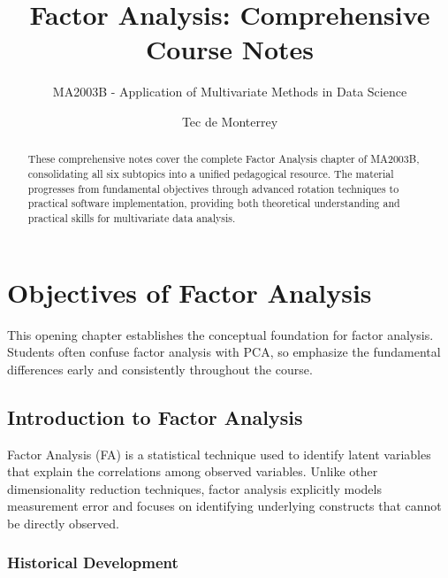 \documentclass[a4paper]{tufte-book}
\title{Factor Analysis: Comprehensive Course Notes}
\author{MA2003B - Application of Multivariate Methods in Data Science}
\date{Tec de Monterrey}
\begin{document}
\frontmatter
\maketitle

\begin{abstract}
These comprehensive notes cover the complete Factor Analysis chapter of MA2003B, consolidating all six subtopics into a unified pedagogical resource. The material progresses from fundamental objectives through advanced rotation techniques to practical software implementation, providing both theoretical understanding and practical skills for multivariate data analysis.
\end{abstract}

\tableofcontents

\mainmatter


\chapter{Objectives of Factor Analysis}

\begin{pedagogicalnote}
This opening chapter establishes the conceptual foundation for factor analysis. Students often confuse factor analysis with PCA, so emphasize the fundamental differences early and consistently throughout the course.
\end{pedagogicalnote}

\section{Introduction to Factor Analysis}

Factor Analysis (FA) is a statistical technique used to identify latent variables that explain the correlations among observed variables. Unlike other dimensionality reduction techniques, factor analysis explicitly models measurement error and focuses on identifying underlying constructs that cannot be directly observed.


\subsection{Historical Development}
\end{document}
